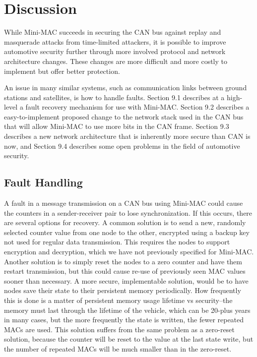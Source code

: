 \section{Discussion}
While Mini-MAC succeeds in securing the CAN bus against replay and masquerade attacks from time-limited attackers, it is possible to improve automotive security further through more involved protocol and network architecture changes. These changes are more difficult and more costly to implement but offer better protection. 

An issue in many similar systems, such as communication links between ground stations and satellites, is how to handle faults. Section 9.1 describes at a high-level a fault recovery mechanism for use with Mini-MAC. Section 9.2 describes a easy-to-implement proposed change to the network stack used in the CAN bus that will allow Mini-MAC to use more bits in the CAN frame. Section 9.3 describes a new network architecture that is inherently more secure than CAN is now, and Section 9.4 describes some open problems in the field of automotive security.

\subsection{Fault Handling}
A fault in a message transmission on a CAN bus using Mini-MAC could cause the counters in a sender-receiver pair to lose synchronization. If this occurs, there are several options for recovery. A common solution is to send a new, randomly selected counter value from one node to the other, encrypted using a backup key not used for regular data transmission. This requires the nodes to support encryption and decryption, which we have not previously specified for Mini-MAC. Another solution is to simply reset the nodes to a zero counter and have them restart transmission, but this could cause re-use of previously seen MAC values sooner than necessary. A more secure, implementable solution, would be to have nodes save their state to their persistent memory periodically. How frequently this is done is a matter of persistent memory usage lifetime vs security--the memory must last through the lifetime of the vehicle, which can be 20-plus years in many cases, but the more frequently the state is written, the fewer repeated MACs are used. This solution suffers from the same problem as a zero-reset solution, because the counter will be reset to the value at the last state write, but the number of repeated MACs will be much smaller than in the zero-reset.

